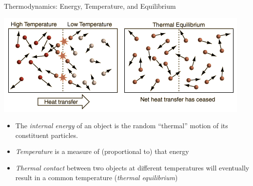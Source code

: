 \documentclass[12pt]{beamer}
\begin{document}
\begin{frame}{Thermodynamics: Energy, Temperature, and Equilibrium}

\begin{center}
\begin{minipage}{0.8\linewidth}
\includegraphics[width=\textwidth]{images/temperature-equilibrium_hyperphysics}\\[-10pt]
\end{minipage}
\end{center}
%

\begin{itemize}
\item The {\em internal energy} of an object is the random ``thermal'' motion of its constituent particles.
\item {\em Temperature} is a measure of (proportional to) that energy
\item {\em Thermal contact} between two objects at different temperatures will eventually result in a common temperature ({\em thermal equilibrium})
\end{itemize}

\end{frame}
\end{document}
